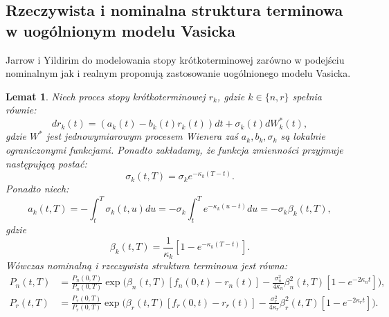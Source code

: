 \documentclass{mini}
\theoremstyle{mythstyle}
\newtheorem{Lemat}{Lemat}[chapter]
\begin{document}
	\subsection{Rzeczywista i nominalna struktura terminowa w uogólnionym modelu Vasicka}
	Jarrow i Yildirim do modelowania stopy krótkoterminowej zarówno w podejściu nominalnym jak i realnym proponują zastosowanie uogólnionego modelu Vasicka. \\
	\begin{Lemat}
		Niech proces stopy krótkoterminowej $r_k$, gdzie $k \in \{n, r\}$ spełnia równie:
		\begin{equation}
		dr_k(t) = (a_k(t) - b_k(t)r_k(t))dt + \sigma_k(t)dW^*_k(t),
		\end{equation}
		gdzie $W^*$ jest jednowymiarowym procesem Wienera zaś $a_k, b_k, \sigma_k$ są lokalnie ograniczonymi funkcjami. Ponadto zakładamy, że funkcja zmienności przyjmuje następującą postać:
		\begin{equation}
		\sigma_k(t,T) = \sigma_k e^{-\kappa_k (T-t)}.
		\end{equation}
		Ponadto niech:
		\begin{equation}
		a_k(t,T) = - \int_t^T \sigma_k(t,u) du = -\sigma_k \int_t^T e^{-\kappa_k(u-t)}du = -\sigma_k\beta_k(t,T),
		\end{equation}
		gdzie 
		\begin{equation}
		\beta_k(t,T) = \frac{1}{\kappa_k} [1 - e^{-\kappa_k(T-t)}].
		\end{equation}
		Wówczas nominalną i rzeczywista struktura terminowa jest równa:
		\begin{align}
		P_n(t, T) &= \frac{P_n(0,T)}{P_n(0,T)} \exp\bigg( \beta_n (t, T) [f_n(0,t) - r_n(t) ]  - \frac{\sigma_n^2}{4\kappa_n} \beta_n^2(t,T) [1 - e^{-2\kappa_n t}] \bigg),\\
		P_r(t, T) &= \frac{P_r(0,T)}{P_r(0,T)} \exp\bigg( \beta_r (t, T) [f_r(0,t) - r_r(t) ]  - \frac{\sigma_r^2}{4\kappa_r} \beta_r^2(t,T) [1 - e^{-2\kappa_rt}] \bigg).
		\end{align}
	\end{Lemat}
\end{document}
